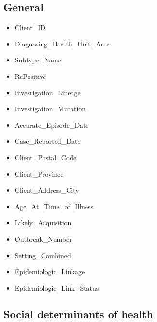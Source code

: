 \documentclass{article}
\begin{document}
\subsection{General}
\begin{itemize}
    \item Client\_ID
    \item Diagnosing\_Health\_Unit\_Area
    \item Subtype\_Name
    \item RePositive
    \item Investigation\_Lineage
    \item Investigation\_Mutation
    \item Accurate\_Episode\_Date
    \item Case\_Reported\_Date
    \item Client\_Postal\_Code
    \item Client\_Province
    \item Client\_Address\_City
    \item Age\_At\_Time\_of\_Illness
    \item Likely\_Acquisition
    \item Outbreak\_Number
    \item Setting\_Combined
    \item Epidemiologic\_Linkage
    \item Epidemiologic\_Link\_Status
\end{itemize}


\subsection{Social determinants of health}
\end{document}
